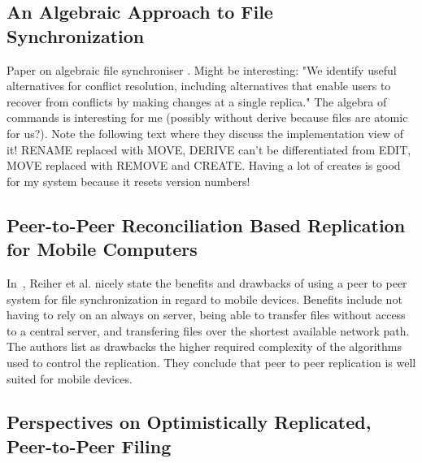 \subsection{An Algebraic Approach to File Synchronization}
\label{sub:An Algebraic Approach to File Synchronization}

Paper on algebraic file synchroniser \cite{ramsey2001algebraic}.
Might be interesting: "We identify useful alternatives for conflict resolution, including alternatives that enable users to recover from conflicts by making changes at a single replica."
The algebra of commands is interesting for me (possibly without derive because files are atomic for us?).
Note the following text where they discuss the implementation view of it!
RENAME replaced with MOVE, DERIVE can't be differentiated from EDIT, MOVE replaced with REMOVE and CREATE.
Having a lot of creates is good for my system because it resets version numbers!

\subsection{Peer-to-Peer Reconciliation Based Replication for Mobile Computers}
\label{sub:Peer-to-Peer Reconciliation Based Replication for Mobile Computers}

In~\cite{reiher1996peer}, Reiher et al. nicely state the benefits and drawbacks of using a peer to peer system for file synchronization in regard to mobile devices.
Benefits include not having to rely on an always on server, being able to transfer files without access to a central server, and transfering files over the shortest available network path.
The authors list as drawbacks the higher required complexity of the algorithms used to control the replication.
They conclude that peer to peer replication is well suited for mobile devices.

\subsection{Perspectives on Optimistically Replicated, Peer-to-Peer Filing}
\label{sub:Perspectives on Optimistically Replicated, Peer-to-Peer Filing}

